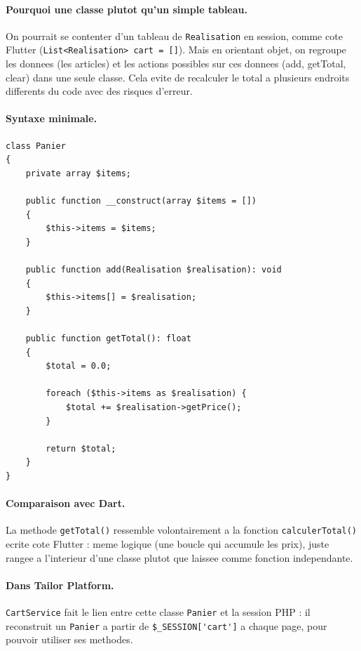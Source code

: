 \documentclass[11pt,a4paper]{article}
\begin{document}
\paragraph{Pourquoi une classe plutot qu'un simple tableau.}
On pourrait se contenter d'un tableau de \verb|Realisation| en session,
comme cote Flutter (\verb|List<Realisation> cart = []|). Mais en
orientant objet, on regroupe les donnees (les articles) et les actions
possibles sur ces donnees (add, getTotal, clear) dans une seule classe. Cela
evite de recalculer le total a plusieurs endroits differents du code avec
des risques d'erreur.

\paragraph{Syntaxe minimale.}

\begin{lstlisting}
class Panier
{
    private array $items;

    public function __construct(array $items = [])
    {
        $this->items = $items;
    }

    public function add(Realisation $realisation): void
    {
        $this->items[] = $realisation;
    }

    public function getTotal(): float
    {
        $total = 0.0;

        foreach ($this->items as $realisation) {
            $total += $realisation->getPrice();
        }

        return $total;
    }
}
\end{lstlisting}

\paragraph{Comparaison avec Dart.}
La methode \verb|getTotal()| ressemble volontairement a la fonction
\verb|calculerTotal()| ecrite cote Flutter : meme logique (une boucle qui
accumule les prix), juste rangee a l'interieur d'une classe plutot que
laissee comme fonction independante.

\paragraph{Dans Tailor Platform.}
\verb|CartService| fait le lien entre cette classe \verb|Panier| et la
session PHP : il reconstruit un \verb|Panier| a partir de
\verb|$_SESSION['cart']| a chaque page, pour pouvoir utiliser ses methodes.
\end{document}
